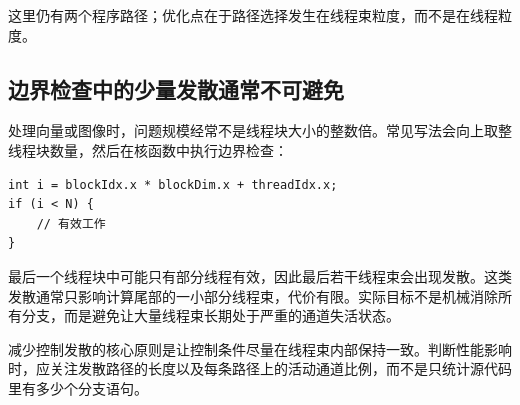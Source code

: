 这里仍有两个程序路径；优化点在于路径选择发生在线程束粒度，而不是在线程粒度。

\subsection{边界检查中的少量发散通常不可避免}

\par\noindent\begin{minipage}{\linewidth}
处理向量或图像时，问题规模经常不是线程块大小的整数倍。常见写法会向上取整线程块数量，然后在核函数中执行边界检查：

\begin{lstlisting}[caption={向量尾部的边界检查}]
int i = blockIdx.x * blockDim.x + threadIdx.x;
if (i < N) {
    // 有效工作
}
\end{lstlisting}
\end{minipage}\par

最后一个线程块中可能只有部分线程有效，因此最后若干线程束会出现发散。这类发散通常只影响计算尾部的一小部分线程束，代价有限。实际目标不是机械消除所有分支，而是避免让大量线程束长期处于严重的通道失活状态。

\begin{keybox}
减少控制发散的核心原则是让控制条件尽量在线程束内部保持一致。判断性能影响时，应关注发散路径的长度以及每条路径上的活动通道比例，而不是只统计源代码里有多少个分支语句。
\end{keybox}
